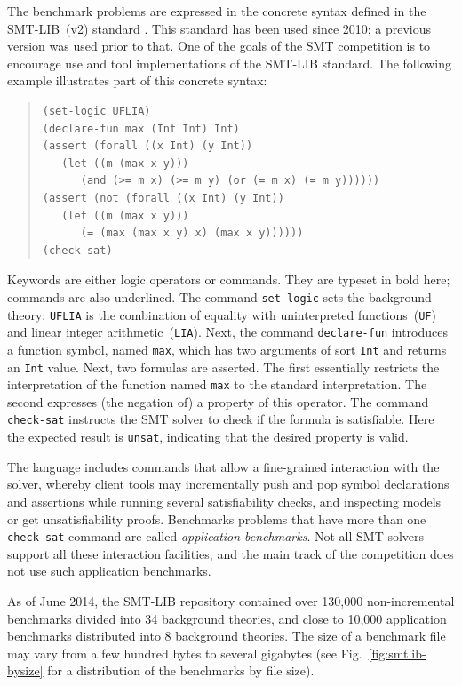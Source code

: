 \documentclass[twoside,11pt]{article}
\begin{document}
The benchmark problems are expressed in the concrete syntax defined in the SMT-LIB~(v2) standard \cite{BarST-RR-10}. This standard has been used since 2010; a previous version was used prior to that. One of the goals of the SMT competition is to encourage use and tool implementations of the SMT-LIB standard. The following example illustrates part of this concrete syntax:
\begin{quote}
\lstset{frameround=fttt}
\begin{lstlisting}[frame=trBL]
(set-logic UFLIA)
(declare-fun max (Int Int) Int)
(assert (forall ((x Int) (y Int))
   (let ((m (max x y)))
      (and (>= m x) (>= m y) (or (= m x) (= m y))))))
(assert (not (forall ((x Int) (y Int))
   (let ((m (max x y)))
      (= (max (max x y) x) (max x y))))))
(check-sat)
\end{lstlisting}
\end{quote}
Keywords are either logic operators or commands. They are typeset in bold here;
commands are also underlined.  The command \lstinline{set-logic}
sets the background theory: \lstinline{UFLIA} is the combination of
equality with uninterpreted functions~(\lstinline{UF}) and linear
integer arithmetic~(\lstinline{LIA}). Next, the command
\lstinline{declare-fun} introduces a function symbol, named
\lstinline{max}, which has two arguments of sort \lstinline{Int} and
returns an \lstinline{Int} value. Next, two formulas are asserted. The
first essentially restricts the interpretation of the function named
\lstinline{max} to the standard interpretation. The second expresses
(the negation of) a property of this operator. The command
\lstinline{check-sat} instructs the SMT solver to check if the formula
is satisfiable. Here the expected result is \lstinline{unsat},
indicating that the desired property is valid.

The language includes commands that allow a fine-grained interaction
with the solver, whereby client tools may incrementally push and pop
symbol declarations and assertions while running several
satisfiability checks, and inspecting models or get unsatisfiability
proofs. Benchmarks problems that have more than one
\lstinline{check-sat} command are called \emph{application
  benchmarks}. Not all SMT solvers support all these interaction
facilities, and the main track of the competition does not use such
application benchmarks.

As of June 2014, the SMT-LIB repository contained over 130,000
non-incremental benchmarks divided into 34 background theories, and
close to 10,000 application benchmarks distributed into 8 background
theories. The size of a benchmark file may vary from a few hundred
bytes to several gigabytes (see Fig.~\ref{fig:smtlib-bysize} for a
distribution of the benchmarks by file size).
\end{document}

